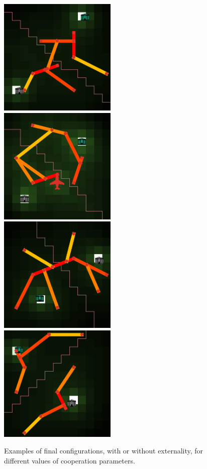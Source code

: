 \begin{figure}
\includegraphics[width=0.5\textwidth]{figures/ex_collab_0}
\includegraphics[width=0.5\textwidth]{figures/ex_dc_finalCollab}\\
\includegraphics[width=0.5\textwidth]{figures/ex_simpleNash_0}
\includegraphics[width=0.5\textwidth]{figures/example_nocollab_0}
\caption[Examples of final configurations]{Examples of final configurations, with or without externality, for different values of cooperation parameters.}
\label{fig:luteciaexample}
\end{figure}


